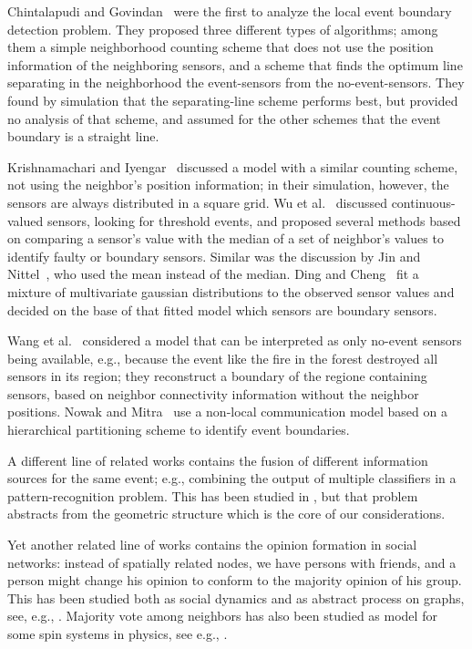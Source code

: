 \documentclass{article}
\begin{document}
Chintalapudi and Govindan~\cite{CG03} were the first to analyze the local
event boundary detection problem. They proposed three different types of
algorithms; among them a simple neighborhood counting scheme that does
not use the position information of the neighboring sensors, and a scheme
that finds the optimum line separating in the neighborhood the event-sensors
from the no-event-sensors.
They found by simulation that the separating-line scheme performs best,
but provided no analysis of that scheme, and assumed for the other schemes
that the event boundary is a straight line.
\par
Krishnamachari and Iyengar~\cite{KI04} discussed a model with a similar
counting scheme, not using the neighbor's position information; in their
simulation, however, the sensors are always distributed in a square grid.
Wu et al.~\cite {WCDXLD07} discussed continuous-valued sensors, looking
for threshold events, and proposed several methods
based on comparing a sensor's value with the median of a set of neighbor's
values to identify faulty or boundary sensors. Similar was the discussion
by Jin and Nittel~\cite{JN06}, who used the mean instead of the median.
Ding and Cheng~\cite{DC09} fit a mixture of multivariate gaussian
distributions to the observed sensor values and decided on the base
of that fitted model which sensors are boundary sensors.

\par
Wang et al.~\cite{WGM06} considered a model that can be interpreted as
only no-event sensors being available, e.g., because the event like the fire in the forest destroyed
all sensors in its region; they reconstruct a boundary of the regione
containing sensors, based on neighbor connectivity information without
the neighbor positions. Nowak and Mitra~\cite {NM03} use a non-local
communication model based on a hierarchical partitioning scheme to
identify event boundaries.
\par
A different line of related works contains the fusion of different
information sources for the same event; e.g., combining
the output of multiple classifiers in a pattern-recognition problem.
This has been studied in \cite{LaS97,KiH*98,AlK99,CC01,Ku02,Na03},
but that problem abstracts from the geometric structure which is the
core of our considerations.
\par
Yet another related line of works contains the opinion formation
in social networks: instead of spatially related nodes, we have
persons with friends, and a person might change his opinion
to conform to the majority opinion of his group. This has been
studied both as social dynamics and as abstract process on graphs,
see, e.g., \cite{Ag*88,MuP01,Pe02,Kr02,MuP04,Zo10}.
Majority vote among neighbors has also been studied as
model for some spin systems in physics, see e.g.,
\cite{Ol92,Li*05,Ya*08,Cu*10}.
\end{document}
